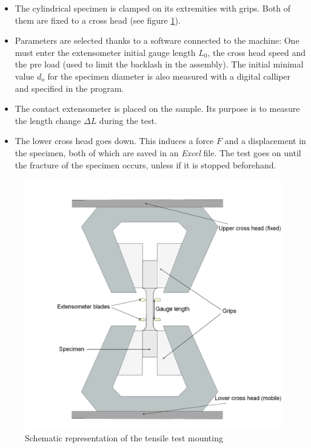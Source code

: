 \begin{itemize}
\item The cylindrical specimen is clamped on its extremities with grips. Both of them are fixed to a cross head (see figure \ref{fig:Trac}).

\item Parameters are selected thanks to a software connected to the machine: 
One must enter the extensometer initial gauge length $L_0$, the cross head speed and the pre load (used to limit the backlash in the assembly). The initial minimal value $d_o$ for the specimen diameter is also measured with a digital calliper and specified in the program.

\item The contact extensometer is placed on the sample. Its purpose is to measure the length change $\Delta L$ during the test. 

\item The lower cross head goes down. This induces a force $F$ and a displacement in the specimen, both of which are saved in an \textit{Excel} file. The test goes on until the fracture of the specimen occurs, unless if it is stopped beforehand.
\end{itemize}

\begin{figure}[ht]
\centering
\centerline{\includegraphics[scale=0.3]{Images/Trac}}
\decoRule
\caption[Schematic representation of the tensile test mounting]{Schematic representation of the tensile test mounting}
\label{fig:Trac}
\end{figure}

